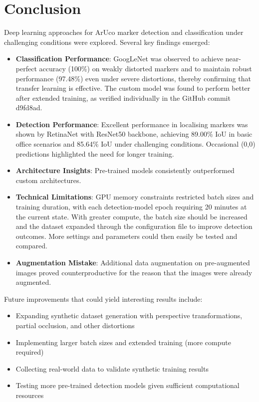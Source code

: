 \documentclass[conference]{IEEEtran}
\begin{document}
\section{Conclusion}

Deep learning approaches for ArUco marker detection and classification under challenging conditions were explored. Several key findings emerged:

\begin{itemize}
    \item \textbf{Classification Performance}: GoogLeNet was observed to achieve near-perfect accuracy (100\%) on weakly distorted markers
    and to maintain robust performance (97.48\%) even under severe distortions, thereby confirming that transfer learning is effective.
    The custom model was found to perform better after extended training, as verified individually in the GitHub commit d9fd8ad.
    
    \item \textbf{Detection Performance}: Excellent performance in localising markers was shown by RetinaNet with ResNet50 backbone, achieving
    89.00\% IoU in basic office scenarios and 85.64\% IoU under challenging conditions. Occasional (0,0) predictions highlighted the need 
    for longer training.
    
    \item \textbf{Architecture Insights}: Pre-trained models consistently outperformed custom architectures.
    
    \item \textbf{Technical Limitations}: GPU memory constraints restricted batch sizes and training duration, with each detection-model
    epoch requiring 20 minutes at the current state. With greater compute, the batch size should be increased and the dataset expanded
    through the configuration file to improve detection outcomes. More settings and parameters could then easily be tested and compared.

    \item \textbf{Augmentation Mistake}: Additional data augmentation on pre-augmented images proved counterproductive for the reason
    that the images were already augmented.
\end{itemize}

Future improvements that could yield interesting results include: 

\begin{itemize}
    \item Expanding synthetic dataset generation with perspective transformations, partial occlusion, and other distortions
    \item Implementing larger batch sizes and extended training (more compute required)
    \item Collecting real-world data to validate synthetic training results
    \item Testing more pre-trained detection models given sufficient computational resources
\end{itemize}
\end{document}
